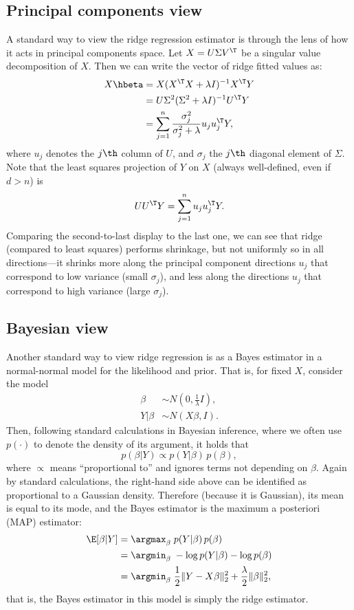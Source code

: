 \documentclass{article}
\begin{document}
\subsection{Principal components view}

A standard way to view the ridge regression estimator is through the lens of how
it acts in principal components space. Let $X = U \Sigma V^\T$ be a singular
value decomposition of $X$. Then we can write the vector of ridge fitted values
as: 
\begin{align*}
X\hbeta &= X (X^\T X + \lambda I)^{-1} X^\T Y \\
&= U \Sigma^2 (\Sigma^2 + \lambda I)^{-1} U^\T Y \\ 
&= \sum_{j=1}^n \frac{\sigma_j^2}{\sigma_j^2+\lambda} u_j u_j^\T Y,  
\end{align*}
where $u_j$ denotes the $j\th$ column of $U$, and $\sigma_j$ the $j\th$ diagonal 
element of $\Sigma$. Note that the least squares projection of $Y$ on $X$
(always well-defined, even if $d > n$) is
\[
U U^\T Y = \sum_{j=1}^n u_j u_j^\T Y.
\]
Comparing the second-to-last display to the last one, we can see that ridge 
(compared to least squares) performs shrinkage, but not uniformly so in all 
directions---it shrinks more along the principal component directions $u_j$ that
correspond to low variance (small $\sigma_j$), and less along the directions
$u_j$ that correspond to high variance (large $\sigma_j$).    

\subsection{Bayesian view}

Another standard way to view ridge regression is as a Bayes estimator in a 
normal-normal model for the likelihood and prior. That is, for fixed $X$,
consider the model 
\begin{equation}
\label{eq:normal_bayes}
\begin{aligned}
\beta &\sim N(0, \frac{1}{\lambda} I), \\
Y | \beta &\sim N(X\beta, I).
\end{aligned}
\end{equation}
Then, following standard calculations in Bayesian inference, where we often use
$p(\cdot)$ to denote the density of its argument, it holds that
\[
p(\beta | Y) \propto p(Y | \beta) \, p(\beta),
\]
where $\propto$ means ``proportional to'' and ignores terms not depending on
$\beta$. Again by standard calculations, the right-hand side above can be
identified as proportional to a Gaussian density. Therefore (because it is
Gaussian), its mean is equal to its mode, and the Bayes estimator is the maximum 
a posteriori (MAP) estimator:
\begin{align}
\nonumber
\E[\beta | Y] &= \argmax_\beta \; p(Y | \beta) \, p(\beta) \\
&= \argmin_\beta \; -\log p(Y | \beta) - \log p(\beta) \\
\label{eq:ridge_bayes}
&= \argmin_\beta \; \frac{1}{2} \|Y - X\beta\|_2^2 + \frac{\lambda}{2}
  \|\beta\|_2^2,
\end{align}
that is, the Bayes estimator in this model is simply the ridge estimator. 
\end{document}
